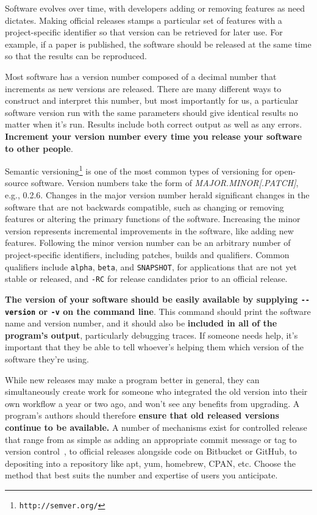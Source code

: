 \documentclass[10pt,letterpaper]{article}
\newcommand{\withurl}[2]{{#1}\footnote{\texttt{#2}}}
\newcommand{\ruleminor}[1]{\textbf{#1}}
\begin{document}
Software evolves over time, with developers adding or removing features as need
dictates. Making official releases stamps a particular set of features with a
project-specific identifier so that version can be retrieved for later use. For
example, if a paper is published, the software should be released at the same
time so that the results can be reproduced. 

Most software has a version number composed of a decimal number that
increments as new versions are released. 
There are many different ways
to construct and interpret this number, but most importantly for us, a
particular software version run with the same parameters should give
identical results no matter when it's run. Results include both correct
output as well as any errors.
\ruleminor{Increment your version number every time you release your software to
other people}.

\withurl{Semantic versioning}{http://semver.org/} is one of the most common
types of versioning for open-source software. Version numbers take the
form of \emph{MAJOR.MINOR{[}.PATCH{]}}, e.g., 0.2.6.
Changes in the major
version number herald significant changes in the software that are not
backwards compatible, such as changing or removing features or altering
the primary functions of the software. Increasing the minor version
represents incremental improvements in the software, like adding new
features. Following the minor version number can be an arbitrary number
of project-specific identifiers, including patches, builds and qualifiers.
Common qualifiers include \texttt{alpha}, \texttt{beta}, and \texttt{SNAPSHOT},
for applications that are
not yet stable or released, and \texttt{-RC} for release candidates prior
to an official release.

\ruleminor{The version of your software should be easily available by 
supplying \texttt{-\/-version} or \texttt{-v} on the command line}. This command should print
the software name and version number, and it should
also be \ruleminor{included in all of the program's output}, particularly debugging
traces.  If someone needs help, it's important that they be able to tell
whoever's helping them which version of the software they're using.

While new releases may make a program better in general,
they can simultaneously create work for someone
who integrated the old version into their own workflow a year or two ago,
and won't see any benefits from upgrading.
A program's authors should therefore \ruleminor{ensure that old released versions
continue to be available.}
A number of mechanisms exist for
controlled release that range from as simple as adding an appropriate
commit message or tag to version control~\cite{blischak2016}, to official releases alongside
code on Bitbucket or GitHub, to depositing into a
repository like apt, yum, homebrew, CPAN, etc. Choose the method that
best suits the number and expertise of users you anticipate.
\end{document}
